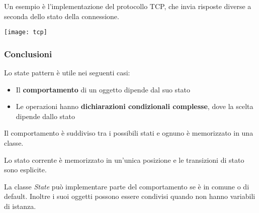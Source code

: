 \begin{example}[TCP]
	Un esempio è l'implementazione del protocollo TCP, che invia risposte diverse a seconda dello stato della connessione.
	\begin{center}
		\texttt{[image: tcp]}
	\end{center}
\end{example}

\subsubsection{Conclusioni}
Lo state pattern è utile nei seguenti casi:
\begin{itemize}
	\item Il \textbf{comportamento} di un oggetto dipende dal suo stato
	\item Le operazioni hanno \textbf{dichiarazioni condizionali complesse}, dove la scelta dipende dallo stato
\end{itemize}

\begin{observation}
	Il comportamento è suddiviso tra i possibili stati e ognuno è memorizzato in una classe.
\end{observation}
\begin{observation}
	Lo stato corrente è memorizzato in un'unica posizione e le transizioni di stato sono esplicite.
\end{observation}
\begin{observation}
	La classe \textit{State} può implementare parte del comportamento se è in comune o di default. Inoltre i suoi oggetti possono essere condivisi quando non hanno variabili di istanza.
\end{observation}